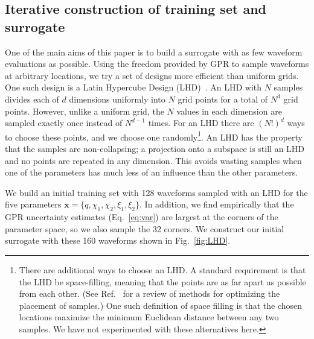 \documentclass[prd,aps,letter,twocolumn,floatfix,notitlepage,nofootinbib]{revtex4-1}
\def\bx{\mathbf{x}}
\newcommand{\MP}[1]{{\textcolor{blue}{\texttt{MP: #1}} }}
\begin{document}
\subsection{Iterative construction of training set and surrogate}
\label{sec:design}

One of the main aims of this paper is to build a surrogate with as few waveform evaluations as possible. Using the freedom provided by GPR to sample waveforms at arbitrary locations, we try a set of designs more efficient than uniform grids. One such design is a Latin Hypercube Design (LHD)~\cite{McKayBeckmanConover1979}. An LHD with $N$ samples divides each of $d$ dimensions uniformly into $N$ grid points for a total of $N^d$ grid points. However, unlike a uniform grid, the $N$ values in each dimension are sampled exactly once instead of $N^{d-1}$ times. For an LHD there are $(N!)^d$ ways to choose these points, and we choose one randomly\footnote{There are additional ways to choose an LHD. A standard requirement is that the LHD be space-filling, meaning that the points are as far apart as possible from each other. (See Ref.~\cite{Husslage2011} for a review of methods for optimizing the placement of samples.) One such definition of space filling is that the chosen locations maximize the minimum Euclidean distance between any two samples. We have not experimented with these alternatives here.}. An LHD has the property that the samples are non-collapsing; a projection onto a subspace is still an LHD and no points are repeated in any dimension. This avoids wasting samples when one of the parameters has much less of an influence than the other parameters. 

We build an initial training set with 128 waveforms sampled with an LHD for the five parameters $\bx = \{q, \chi_1, \chi_2, \xi_1, \xi_2\}$. 
In addition, we find empirically that the GPR uncertainty estimates (Eq.~\eqref{eq:var})
are largest at the corners of the parameter space, so we also sample the 32 corners. We construct our initial surrogate with these 160 waveforms shown in Fig.~\ref{fig:LHD}.
\end{document}
